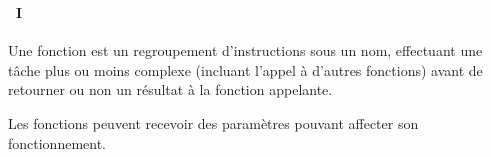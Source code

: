 \begin{frame}
  \frametitle{\secname}
  \framesubtitle{\subsecname~I}
  \par
  Une fonction est un regroupement d'instructions sous un nom, effectuant une tâche plus ou moins complexe 
  (incluant l'appel à d'autres fonctions) avant de retourner ou non un résultat à la fonction appelante.
  \vspace{0.5cm}
  \par
  Les fonctions peuvent recevoir des paramètres pouvant affecter son fonctionnement.
\end{frame}

